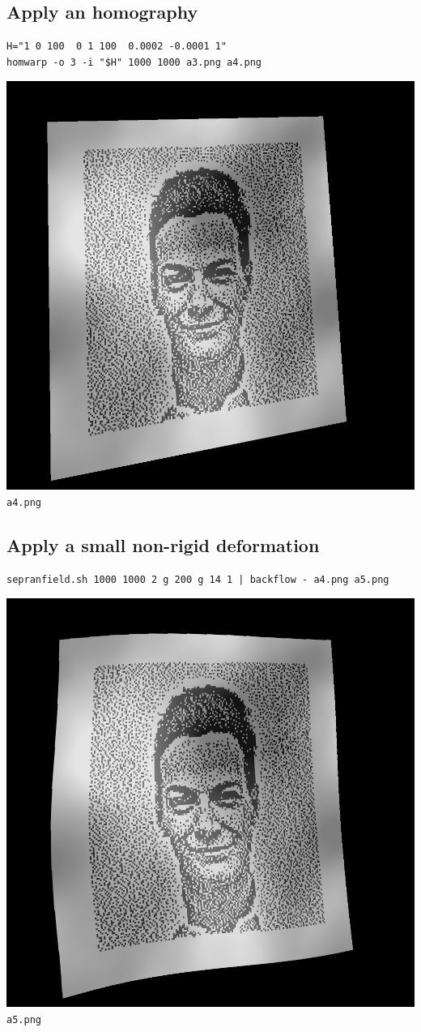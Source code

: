 \clearpage
\subsection{Apply an homography}
\begin{verbatim}
H="1 0 100  0 1 100  0.0002 -0.0001 1"
homwarp -o 3 -i "$H" 1000 1000 a3.png a4.png
\end{verbatim}
\includegraphics{a4.png}\verb+a4.png+

\clearpage
\subsection{Apply a small non-rigid deformation}
\begin{verbatim}
sepranfield.sh 1000 1000 2 g 200 g 14 1 | backflow - a4.png a5.png
\end{verbatim}
\includegraphics{a5.png}\verb+a5.png+

